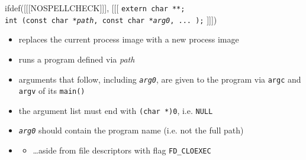 \begin{slide}
ifdef([[[NOSPELLCHECK]]], [[[
\texttt{extern char **;\\
int (const char *\emph{path}, const char *\emph{arg0}, ... );}
]]])
\begin{itemize}
\item replaces the current process image with a new process image
\item runs a program defined via \emph{path}
\item arguments that follow, including \emph{\texttt{arg0}}, are given to the
program via \texttt{argc} and \texttt{argv} of its \texttt{main()}
\item the argument list must end with \texttt{(char *)0}, i.e. \texttt{NULL}
\item \emph{\texttt{arg0}} should contain the program name (i.e. not the full
path)
\item {}
\begin{itemize}
\item \dots{}aside from file descriptors with flag \texttt{FD\_CLOEXEC}
\end{itemize}
\end{itemize}
\end{slide}


